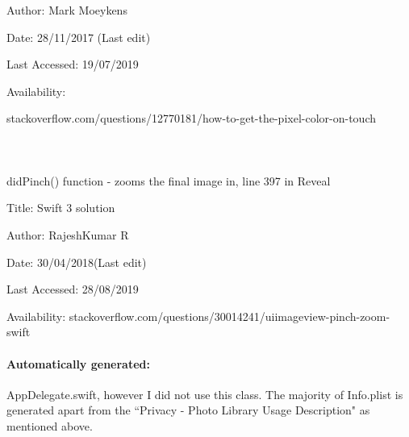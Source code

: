 \documentclass[11pt]{article}
\begin{document}
            Author: Mark Moeykens
            
            Date: 28/11/2017 (Last edit)
            
            Last Accessed: 19/07/2019
            
            Availability:
            
            stackoverflow.com/questions/12770181/how-to-get-the-pixel-color-on-touch
            
            \paragraph{\\}
            
            didPinch() function - zooms the final image in, line 397 in Reveal
            
            Title: Swift 3 solution
            
            Author: RajeshKumar R
            
            Date: 30/04/2018(Last edit)
            
            Last Accessed: 28/08/2019
            
            Availability: stackoverflow.com/questions/30014241/uiimageview-pinch-zoom-swift
            
            \paragraph{Automatically generated:}
            AppDelegate.swift, however I did not use this class. 
            The majority of Info.plist is generated apart from the ``Privacy - Photo Library Usage Description" as mentioned above. 
    
    \newpage
{}
\end{document}
